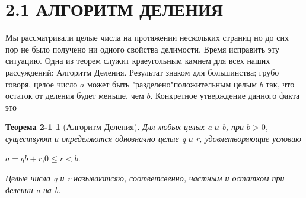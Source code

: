 \documentclass[11pt]{article}
\newtheorem*{theorem*}{Теорема 2-1}
\begin{document}
\leftskip=-0.9cm \section*{2.1 АЛГОРИТМ ДЕЛЕНИЯ}
\Large \leftskip=-0.9cm \rightskip=-0.9cm \thispagestyle{1} Мы рассматривали целые числа на протяжении нескольких страниц но до сих пор не было получено ни одного свойства делимости. Время исправить эту ситуацию. Одна из теорем служит краеугольным камнем для всех наших рассуждений: Алгоритм Деления. Результат знаком для большинства; грубо говоря, целое число $a$ может быть "разделено"\:положительным целым $b$ так, что остаток от деления будет меньше, чем $b$. Конкретное утверждение данного факта это\\
\begin{theorem*}[Алгоритм Деления] Для любых целых a и b, при $b>0$, существуют и определяются однозначно целые q и r, удовлетворяющие условию
\begin{flushright}
$a=qb+r$,\qquad \qquad \qquad \qquad \qquad $0\leq r<b.$
\end{flushright}
Целые числа q и r называютсяю,  соответсвенно, частным и остатком при делении a на b.
\end{theorem*}
\end{document}
